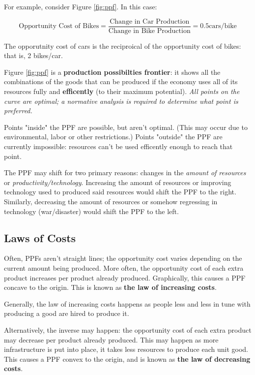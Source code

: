 \documentclass[12pt, a4paper]{article}
\theoremstyle{definition}
\begin{document}
For example, consider Figure \ref{fig:ppf}.
In this case:

\[\textrm{Opportunity Cost of Bikes} = \frac{\textrm{Change in Car Production}}{\textrm{Change in Bike Production}} = 0.5 \textrm{cars}/\textrm{bike}\]

The opporutnity cost of cars is the reciproical of the opportunity cost of bikes: that is, 2 bikes/car.

Figure \ref{fig:ppf} is a \textbf{production possibilties frontier}: it shows all the combinations of the goods that can be produced if the economy uses all of its resources fully and \textbf{efficently} (to their maximum potential).
\textit{All points on the curve are optimal; a normative analysis is required to determine what point is preferred.}

Points "inside" the PPF are possible, but aren't optimal. (This may occur due to environmental, labor or other restrictions.)
Points "outside" the PPF are currently impossible: resources can't be used efficently enough to reach that point.

The PPF may shift for two primary reasons: changes in the \textit{amount of resources} or \textit{productivity/technology}.
Increasing the amount of resources or improving technology used to produced said resources would shift the PPF to the right.
Similarly, decreasing the amount of resources or somehow regressing in technology (war/disaster) would shift the PPF to the left.


\subsection{Laws of Costs}
Often, PPFs aren't straight lines; the opportunity cost varies depending on the current amount being produced.
More often, the opportunity cost of each extra product increases per product already produced.
Graphically, this causes a PPF concave to the origin.
This is known as \textbf{the law of increasing costs}.

Generally, the law of increasing costs happens as people less and less in tune with producing a good are hired to produce it.

Alternatively, the inverse may happen: the opportunity cost of each extra product may decrease per product already produced.
This may happen as more infrastructure is put into place, it takes less resources to produce each unit good.
This causes a PPF convex to the origin, and is known as \textbf{the law of decreasing costs}.
\end{document}
